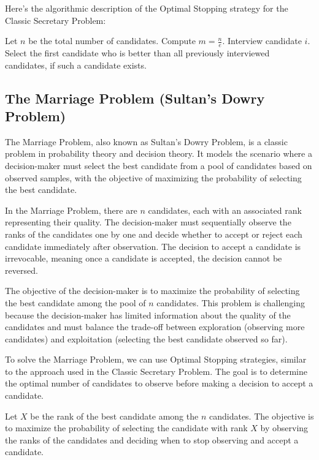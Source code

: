 \documentclass[12pt]{book} %
\begin{document}
Here's the algorithmic description of the Optimal Stopping strategy for the Classic Secretary Problem:
\FloatBarrier
\begin{algorithm}
\caption{Optimal Stopping Algorithm for Classic Secretary Problem}
\begin{algorithmic}[1]
\State Let \(n\) be the total number of candidates.
\State Compute \(m = \frac{n}{e}\).
    \State Interview candidate \(i\).
\EndFor
\State Select the first candidate who is better than all previously interviewed candidates, if such a candidate exists.
\end{algorithmic}
\end{algorithm}

\subsection{The Marriage Problem (Sultan's Dowry Problem)}
The Marriage Problem, also known as Sultan's Dowry Problem, is a classic problem in probability theory and decision theory. It models the scenario where a decision-maker must select the best candidate from a pool of candidates based on observed samples, with the objective of maximizing the probability of selecting the best candidate.

In the Marriage Problem, there are \(n\) candidates, each with an associated rank representing their quality. The decision-maker must sequentially observe the ranks of the candidates one by one and decide whether to accept or reject each candidate immediately after observation. The decision to accept a candidate is irrevocable, meaning once a candidate is accepted, the decision cannot be reversed.

The objective of the decision-maker is to maximize the probability of selecting the best candidate among the pool of \(n\) candidates. This problem is challenging because the decision-maker has limited information about the quality of the candidates and must balance the trade-off between exploration (observing more candidates) and exploitation (selecting the best candidate observed so far).

To solve the Marriage Problem, we can use Optimal Stopping strategies, similar to the approach used in the Classic Secretary Problem. The goal is to determine the optimal number of candidates to observe before making a decision to accept a candidate.

Let \(X\) be the rank of the best candidate among the \(n\) candidates. The objective is to maximize the probability of selecting the candidate with rank \(X\) by observing the ranks of the candidates and deciding when to stop observing and accept a candidate.
\end{document}
